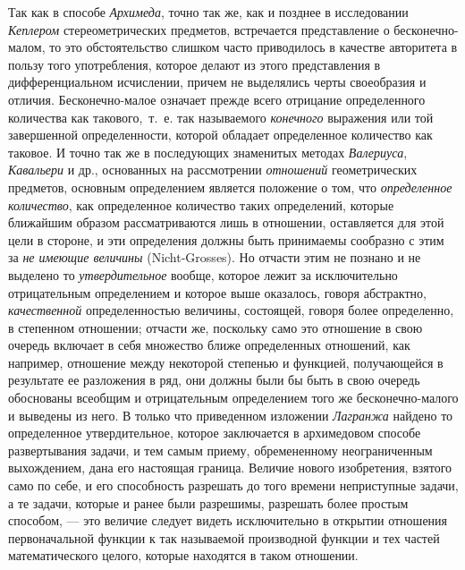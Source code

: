 Так как в способе {\em Архимеда}, точно так же, как и
позднее в исследовании {\em Кеплером} стереометрических
предметов, встречается представление о бесконечно-малом, то это
обстоятельство слишком часто приводилось в качестве авторитета в пользу
того употребления, которое делают из этого представления в дифференциальном
исчислении, причем не выделялись черты своеобразия и отличия.
Бесконечно-малое означает прежде всего отрицание определенного количества
как такового,~т.~е. так называемого {\em конечного}
выражения или той завершенной определенности, которой обладает определенное
количество как таковое. И точно так же в последующих знаменитых методах
{\em Валериуса}, {\em Кавальери} и
др., основанных на рассмотрении {\em отношений}
геометрических предметов, основным определением является положение о том,
что {\em определенное количество}, как определенное
количество таких определений, которые ближайшим образом рассматриваются
лишь в отношении, оставляется для этой цели в стороне, и эти определения
должны быть принимаемы сообразно с этим за {\em не
имеющие величины} (Nicht-Grosses). Но отчасти этим не познано и не выделено
то {\em утвердительное} вообще, которое лежит за
исключительно отрицательным определением и которое выше оказалось, говоря
абстрактно, {\em качественной} определенностью
величины, состоящей, говоря более определенно, в степенном отношении;
отчасти же, поскольку само это отношение в свою очередь включает в себя
множество ближе определенных отношений, как например, отношение между
некоторой степенью и функцией, получающейся в результате ее разложения в
ряд, они должны были бы быть в свою очередь обоснованы всеобщим и
отрицательным определением того же бесконечно-малого и выведены из него. В
только что приведенном изложении {\em Лагранжа} найдено
то определенное утвердительное, которое заключается в архимедовом способе
развертывания задачи, и тем самым приему, обремененному неограниченным
выхождением, дана его настоящая граница. Величие нового изобретения,
взятого само по себе, и его способность разрешать до того времени
неприступные задачи, а те задачи, которые и ранее были разрешимы, разрешать
более простым способом, — это величие следует видеть исключительно в
открытии отношения первоначальной функции к так называемой производной
функции и тех частей математического целого, которые находятся в таком
отношении.

